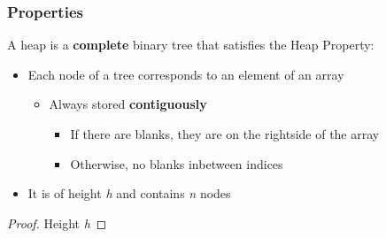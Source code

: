 \documentclass[10pt, 
a4paper, 
oneside, 
headinclude, footinclude, 
BCOR5mm]
{scrartcl}
\begin{document}
\subsubsection{Properties}
A heap is a \textbf{complete} binary tree that satisfies the Heap Property:
\begin{itemize}
    \item Each node of a tree corresponds to an element of an array
    \begin{itemize}
        \item Always stored \textbf{contiguously}
        \begin{itemize}
            \item  If there are blanks, they are on the rightside of the array
            \item  Otherwise, no blanks inbetween indices
        \end{itemize}
    \end{itemize}
    \item It is of height \textit{h} and contains \textit{n} nodes
\end{itemize}
\begin{proof}
    Height \textit{h}
\end{proof}
\BlankLine
\end{document}

